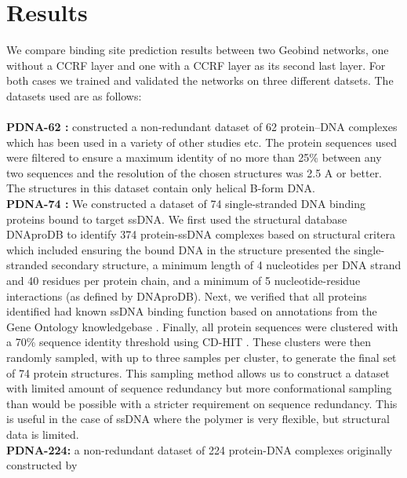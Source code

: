 \section{Results}
We compare binding site prediction results between two Geobind networks, one without a CCRF layer
and one with a CCRF layer as its second last layer. For both cases we trained and validated the
networks on three different datsets. The datasets used are as follows:\\
\\
\textbf{PDNA-62 :} \citet{ahmad2004analysis} constructed a non-redundant dataset of 62 protein–DNA complexes which has been
used in a variety of other studies \citep{kuznetsov2006transient, wang2006bindn} etc. The protein
sequences used were filtered to ensure a maximum identity of no more than 25\% between any two sequences and the
resolution of the chosen structures was 2.5 A or better. The structures in this dataset contain only helical B-form DNA.\\
\textbf{PDNA-74 :} We constructed a dataset of 74 single-stranded DNA binding proteins bound to target ssDNA. We first
used the structural database DNAproDB \citep{sagendorf2017dnaprodb,sagendorf2020dnaprodb} to identify 374 protein-ssDNA complexes based on structural critera
which included ensuring the bound DNA in the structure presented the single-stranded secondary structure, a minimum
length of 4 nucleotides per DNA strand and 40 residues per protein chain, and a minimum of 5 nucleotide-residue
interactions (as defined by DNAproDB). Next, we verified that all proteins identified had known ssDNA binding
function based on annotations from the Gene Ontology knowledgebase \citep{gene2019gene}.  Finally, all protein sequences were
clustered with a 70\% sequence identity threshold using CD-HIT \citep{li2006cd}. These clusters were then randomly sampled,
with up to three samples per cluster, to generate the final set of 74 protein structures. This sampling method allows us
to construct a dataset with limited amount of sequence redundancy but more conformational sampling than would be
possible with a stricter requirement on sequence redundancy. This is useful in the case of ssDNA where the polymer is
very flexible, but structural data is limited.\\
\textbf{PDNA-224:} a non-redundant dataset of 224 protein-DNA complexes originally constructed by
\citet{li2013predna}\\

